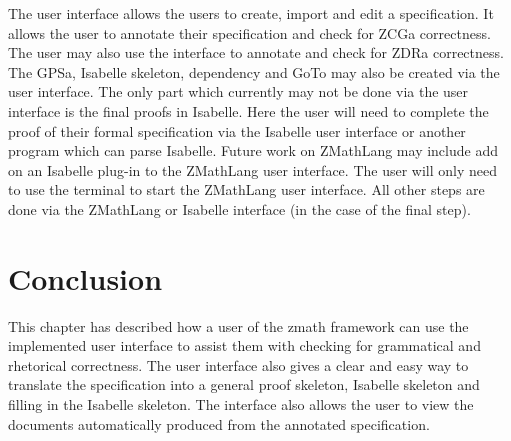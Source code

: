 The user interface allows the users to create, import and edit a specification. It allows the
user to annotate their specification and check for ZCGa correctness. The user may also use the
interface to annotate and check for ZDRa correctness. The GPSa, Isabelle skeleton, dependency 
and GoTo may also be created via the user interface. The only part which currently may not be
done via the user interface is the final proofs in Isabelle. Here the user will need to complete
 the proof of their formal specification via the Isabelle user interface or another program 
 which can parse Isabelle. Future work on ZMathLang may include add on an Isabelle plug-in to 
 the ZMathLang user interface.
 The user will only need to use the terminal to start the ZMathLang user interface. All other
  steps are done via the ZMathLang or Isabelle interface (in the case of the final step).

\section{Conclusion}
This chapter has described how a user of the \gls{zmath} framework can use the
implemented user interface to assist them with checking for grammatical and
rhetorical correctness. The user interface also gives a clear and easy way to
translate the specification into a general proof skeleton, Isabelle skeleton and
filling in the Isabelle skeleton. The
interface also allows the user to view the documents automatically produced from
the annotated specification.
